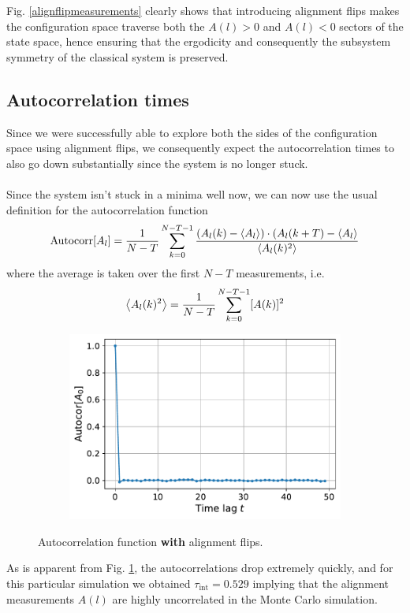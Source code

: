 \documentclass[../journal_main.tex]{subfiles}
\begin{document}
Fig. \ref{alignflipmeasurements} clearly shows that introducing alignment flips makes the configuration space traverse both the $A(l)>0$ and $A(l)<0$ sectors of the state space, hence ensuring that the ergodicity and consequently the subsystem symmetry of the classical system is preserved.   

\subsection{Autocorrelation times}
Since we were successfully able to explore both the sides of the configuration space using alignment flips, we consequently expect the autocorrelation times to also go down substantially since the system is no longer stuck.~\\~\\
Since the system isn't stuck in a minima well now, we can now use the usual definition for the autocorrelation function 
\begin{equation}
    \text{Autocorr}[A_l] = \frac{1}{N-T} \sum_{k=0}^{N-T-1} \frac{(A_l(k) - \expval{A_l}) \cdot (A_l(k+T) - \expval{A_l}}{\expval{A_l(k)^2}}
\end{equation} 
where the average is taken over the first $N-T$ measurements, i.e.
\[
    \expval{A_l(k)^2} = \frac{1}{N-T} \sum_{k=0}^{N-T-1} [A(k)]^2
\] 
\begin{figure}[!htb]
    \centering
    \begin{subfigure}[b]{0.5\textwidth}
        \centering
        \includegraphics[width=\textwidth]{images/fix_subsystem_symmetry/Autocor[A(l)] (l=0).pdf}
    \end{subfigure}
    \caption{Autocorrelation function \textbf{with} alignment flips.}
    \label{alignflipautocorr}
\end{figure}
\FloatBarrier
As is apparent from Fig. \ref{alignflipautocorr}, the autocorrelations drop extremely quickly, and for this particular simulation we obtained $\boxed{\tau_\text{int} = 0.529}$ implying that the alignment measurements $A(l)$ are highly uncorrelated in the Monte Carlo simulation.   
\end{document}
